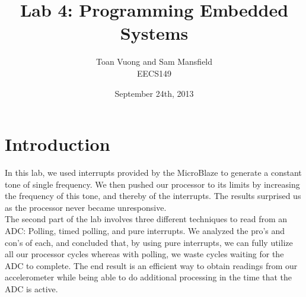 \documentclass[10pt]{article}
\begin{document}
  \title{Lab 4: Programming Embedded Systems}
  \author{Toan Vuong and Sam Mansfield\\
          EECS149}
  \date{September 24th, 2013}
  \maketitle

  \section*{Introduction}
  In this lab, we used interrupts provided by the MicroBlaze to generate a constant tone of single frequency. We then pushed our processor to its limits by increasing the frequency of this tone, and thereby of the interrupts. The results surprised us as the processor never became unresponsive. \\
  The second part of the lab involves three different techniques to read from an ADC: Polling, timed polling, and pure interrupts. We analyzed the pro's and con's of each, and concluded that, by using pure interrupts, we can fully utilize all our processor cycles whereas with polling, we waste cycles waiting for the ADC to complete. The end result is an efficient way to obtain readings from our accelerometer while being able to do additional processing in the time that the ADC is active.
\end{document}
